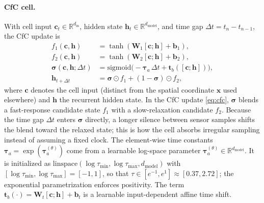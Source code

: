 \paragraph{CfC cell.}
With cell input $\mathbf{c}_t \in \mathbb{R}^{d_{\text{in}}}$, hidden state $\mathbf{h}_t \in \mathbb{R}^{d_{\text{model}}}$, and time gap $\Delta t = t_n - t_{n-1}$, the CfC update is
\begin{subequations}
\label{eq:cfc}
\begin{align}
    f_1(\mathbf{c},\mathbf{h}) &= \tanh(\mathbf{W}_1[\mathbf{c};\mathbf{h}] + \mathbf{b}_1),\\
    f_2(\mathbf{c},\mathbf{h}) &= \tanh(\mathbf{W}_2[\mathbf{c};\mathbf{h}] + \mathbf{b}_2),\\
    \boldsymbol{\sigma}(\mathbf{c},\mathbf{h};\Delta t) &= \mathrm{sigmoid}\!\big(-\boldsymbol{\tau}_a\,\Delta t + \mathbf{t}_b([\mathbf{c};\mathbf{h}])\big),\\
    \mathbf{h}_{t+\Delta t} &= \boldsymbol{\sigma} \odot f_1 + (1-\boldsymbol{\sigma}) \odot f_2,
\end{align}
\end{subequations}
where $\mathbf{c}$ denotes the cell input (distinct from the spatial coordinate $\mathbf{x}$ used elsewhere) and $\mathbf{h}$ the recurrent hidden state. In the CfC update \eqref{eq:cfc}, $\boldsymbol{\sigma}$ blends a fast-response candidate state $f_1$ with a slow-relaxation candidate $f_2$. Because the time gap $\Delta t$ enters $\boldsymbol{\sigma}$ directly, a longer silence between sensor samples shifts the blend toward the relaxed state; this is how the cell absorbs irregular sampling instead of assuming a fixed clock. The element-wise time constants $\boldsymbol{\tau}_a = \exp(\boldsymbol{\tau}_a^{(\theta)})$ come from a learnable log-space parameter $\boldsymbol{\tau}_a^{(\theta)}\in\mathbb{R}^{d_{\text{model}}}$. It is initialized as $\mathrm{linspace}(\log\tau_{\min}, \log\tau_{\max}, d_{\text{model}})$ with $[\log\tau_{\min}, \log\tau_{\max}] = [-1, 1]$, so that $\tau \in [e^{-1}, e^{1}] \approx [0.37, 2.72]$; the exponential parametrization enforces positivity. The term $\mathbf{t}_b(\cdot) = \mathbf{W}_t[\mathbf{c};\mathbf{h}] + \mathbf{b}_t$ is a learnable input-dependent affine time shift.


